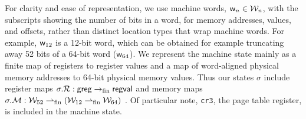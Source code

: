 For clarity and ease of representation, we use machine words, $\mathsf{w}_n \in \mathcal{W}_n$, with the subscripts showing the number of bits in a word,
for memory addresses, values, and offsets, rather than distinct location types that wrap machine words.
For example, $\mathsf{w}_{12}$ is a 12-bit word, which can be obtained for example truncating away 52 bits of a 64-bit word ($\mathsf{w}_{64}$).
\label{sec:state}
We represent the machine state mainly as a finite map of registers to register values and a map of word-aligned physical memory addresses 
to 64-bit physical memory values. 
Thus our states $\sigma$ include register maps $\sigma.\mathcal{R}: \mathsf{greg} \rightarrow_{\textrm{fin}} \mathsf{regval} $ and
memory maps $\sigma.\mathcal{M}: \mathcal{W}_{52} \rightharpoonup_{\textrm{fin}} (\mathcal{W}_{12} \rightharpoonup_{\textrm{fin}} \mathcal{W}_{64} )$
.
Of particular note, \lstinline|cr3|, the page table register, is included in the machine state.


\label{sec:instructions}

